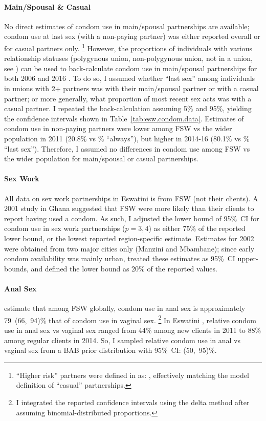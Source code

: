 \paragraph{Main/Spousal \& Casual}
No direct estimates of condom use in main/spousal partnerships are available;
condom use at last sex (with a non-paying partner)
was either reported overall or for casual partners only.%
\footnote{``Higher risk'' partners were defined in \cite{SDHS2006} as:
  ,
    effectively matching the model definition of ``casual'' partnerships.}
However, the proportions of individuals with various relationship statuses
(\eg polygynous union, non-polygynous union, not in a union, see )
can be used to back-calculate condom use in main/spousal partnerships
for both 2006 \cite{SDHS2006} and 2016 \cite{SHIMS2}.
To do so, I assumed whether ``last sex'' among individuals in unions with 2+ partners
was with their main/spousal partner or with a casual partner;
or more generally, what proportion of most recent sex acts was with a casual partner.
I repeated the back-calculation assuming 5\% and 95\%,
yielding the confidence intervals shown in Table~\ref{tab:esw.condom.data}.
Estimates of condom use in non-paying partners were
lower among FSW vs the wider population in 2011 (20.8\% vs \% ``always''), but
higher in 2014-16 (80.1\% vs \% ``last sex'').
Therefore, I assumed no differences in condom use
among FSW vs the wider population for main/spousal or casual partnerships.
\paragraph{Sex Work}
All data on sex work partnerships in Eswatini is from FSW (\ie not their clients).
A 2001 study in Ghana \cite{Cote2004} suggested that
FSW were more likely than their clients to report having used a condom.
As such, I adjusted the lower bound of 95\%~CI for condom use in sex work partnerships ($p=3,4$)
as either 75\% of the reported lower bound, or the lowest reported region-specific estimate.
Estimates for 2002 \cite{EswSBSS2002} were obtained from two major cities only (Manzini and Mbambane);
since early condom availability was mainly urban,
treated these estimates as 95\%~CI upper-bounds,
and defined the lower bound as 20\% of the reported values.
\paragraph{Anal Sex}
\citet{Owen2020a} estimate that among FSW globally,
condom use in anal sex is approximately 79~(66,~94)\% that of condom use in vaginal sex.%
\footnote{I integrated the reported confidence intervals using the delta method
  after assuming binomial-distributed proportions.}
In Eswatini \cite{Baral2014,EswKP2014}, relative condom use in anal sex vs vaginal sex
ranged from 44\% among new clients in 2011 to 88\% among regular clients in 2014.
So, I sampled relative condom use in anal vs vaginal sex from a BAB prior distribution
with 95\%~CI: (50,~95)\%.
